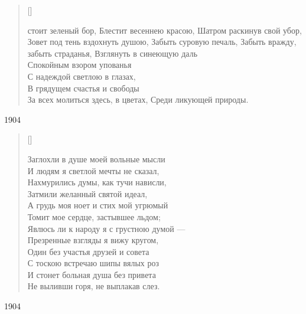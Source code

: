 \settowidth{\versewidth}{За всех молиться здесь, в цветах}
\begin{verse}[\versewidth]
\begin{patverse*}
 стоит зеленый бор,
Блестит весеннею красою,
Шатром раскинув свой убор,
Зовет под тень вздохнуть душою,
Забыть суровую печаль,
Забыть вражду, забыть страданья,
Взглянуть в синеющую даль\\
Спокойным взором упованья\\
С надеждой светлою в глазах,\\
В грядущем счастья и свободы\\
За всех молиться здесь, в цветах,
Среди ликующей природы.
\end{patverse*}
\end{verse}
1904




\settowidth{\versewidth}{Заглохли в душе моей вольные мысли}
\begin{verse}[\versewidth]
\begin{altverse*}
Заглохли в душе моей вольные мысли\\
И людям я светлой мечты не сказал,\\
Нахмурились думы, как тучи нависли,\\
Затмили желанный святой идеал,\\
А грудь моя ноет и стих мой угрюмый\\
Томит мое сердце, застывшее льдом;\\
Явлюсь ли к народу я с грустною думой ---\\
Презренные взгляды я вижу кругом,\\
Один без участья друзей и совета\\
С тоскою встречаю шипы вялых роз\\
И стонет больная душа без привета\\
Не выливши горя, не выплакав слез.
\end{altverse*}
\end{verse}
1904



